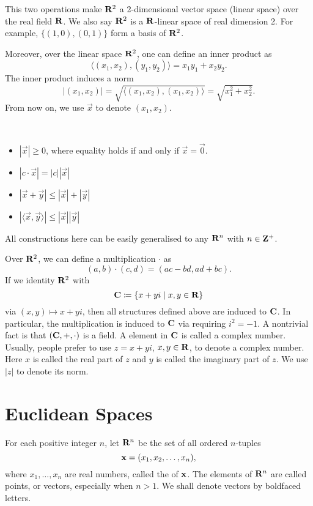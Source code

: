 This two operations make $\mathbf R^2$ a 2-dimensional vector space (linear space) over the real field $\mathbf R$. We also say $\mathbf R^2$ is a $\mathbf R$-linear space of real dimension 2. For example, $\{(1,0),(0,1)\}$ form a basis of $\mathbf R^2$.

Moreover, over the linear space $\mathbf R^2$, one can define an inner product as
\[ \langle(x_1,x_2),(y_1,y_2)\rangle=x_1y_1+x_2y_2. \]
The inner product induces a norm
\[ |(x_1,x_2)|=\sqrt{\langle(x_1,x_2),(x_1,x_2)\rangle}=\sqrt{x_1^2+x_2^2}. \]
From now on, we use $\vec{x}$ to denote $(x_1,x_2)$.
\begin{proposition} \
\begin{itemize}
\item $|\vec{x}|\ge0$, where equality holds if and only if $\vec{x}=\vec{0}$.
\item $|c\cdot\vec{x}|=|c||\vec{x}|$
\item $|\vec{x}+\vec{y}|\le|\vec{x}|+|\vec{y}|$
\item $|\langle\vec{x},\vec{y}\rangle|\le|\vec{x}||\vec{y}|$
\end{itemize}
\end{proposition}

All constructions here can be easily generalised to any $\mathbf R^n$ with $n\in\mathbf Z^+$.

Over $\mathbf R^2$, we can define a multiplication $\cdot$ as
\[ (a,b)\cdot(c,d)=(ac-bd,ad+bc). \]
If we identity $\mathbf R^2$ with
\[ \mathbf C\coloneqq\{x+yi\mid x,y\in\mathbf R\} \]
via $(x,y)\mapsto x+yi$, then all structures defined above are induced to $\mathbf C$. In particular, the multiplication is induced to $\mathbf C$ via requiring $i^2=-1$. A nontrivial fact is that $(\mathbf C,+,\cdot)$ is a field. A element in $\mathbf C$ is called a complex number. Usually, people prefer to use $z=x+yi$, $x,y\in\mathbf R$, to denote a complex number. Here $x$ is called the real part of $z$ and $y$ is called the imaginary part of $z$. We use $|z|$ to denote its norm.
\pagebreak

\section{Euclidean Spaces}
For each positive integer $n$, let $\mathbf R^n$ be the set of all ordered $n$-tuples
\[ \vb{x}=(x_1,x_2,\dots,x_n), \]
where $x_1,\dots,x_n$ are real numbers, called the  of $\vb{x}$. The elements of $\mathbf R^n$ are called points, or vectors, especially when $n>1$. We shall denote vectors by boldfaced letters.

